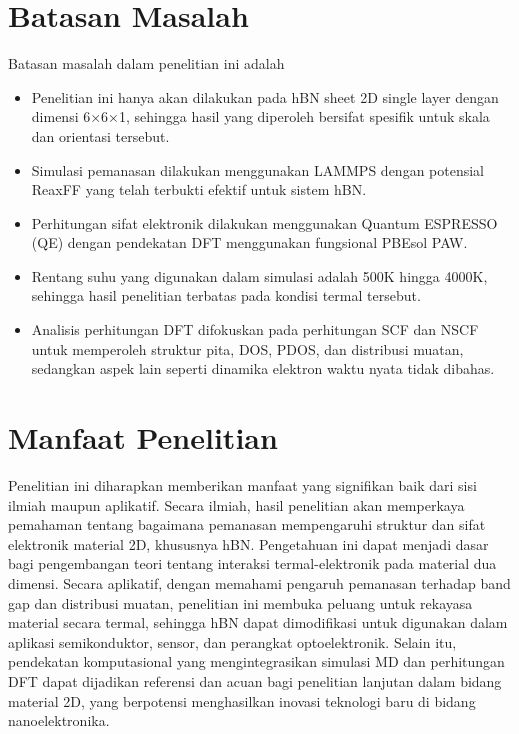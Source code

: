 \section{Batasan Masalah}
Batasan masalah dalam penelitian ini adalah
\begin{itemize}
    \item Penelitian ini hanya akan dilakukan pada hBN sheet 2D single layer dengan dimensi 6×6×1, sehingga hasil yang diperoleh bersifat spesifik untuk skala dan orientasi tersebut.
    \item Simulasi pemanasan dilakukan menggunakan LAMMPS dengan potensial ReaxFF yang telah terbukti efektif untuk sistem hBN.
    \item Perhitungan sifat elektronik dilakukan menggunakan Quantum ESPRESSO (QE) dengan pendekatan DFT menggunakan fungsional PBEsol PAW.
    \item Rentang suhu yang digunakan dalam simulasi adalah 500K hingga 4000K, sehingga hasil penelitian terbatas pada kondisi termal tersebut.
    \item Analisis perhitungan DFT difokuskan pada perhitungan SCF dan NSCF untuk memperoleh struktur pita, DOS, PDOS, dan distribusi muatan, sedangkan aspek lain seperti dinamika elektron waktu nyata tidak dibahas.
\end{itemize}

\section{Manfaat Penelitian}
Penelitian ini diharapkan memberikan manfaat yang signifikan baik dari sisi ilmiah maupun aplikatif. Secara ilmiah, hasil penelitian akan memperkaya pemahaman tentang bagaimana pemanasan mempengaruhi struktur dan sifat elektronik material 2D, khususnya hBN. Pengetahuan ini dapat menjadi dasar bagi pengembangan teori tentang interaksi termal-elektronik pada material dua dimensi. Secara aplikatif, dengan memahami pengaruh pemanasan terhadap band gap dan distribusi muatan, penelitian ini membuka peluang untuk rekayasa material secara termal, sehingga hBN dapat dimodifikasi untuk digunakan dalam aplikasi semikonduktor, sensor, dan perangkat optoelektronik. Selain itu, pendekatan komputasional yang mengintegrasikan simulasi MD dan perhitungan DFT dapat dijadikan referensi dan acuan bagi penelitian lanjutan dalam bidang material 2D, yang berpotensi menghasilkan inovasi teknologi baru di bidang nanoelektronika.
